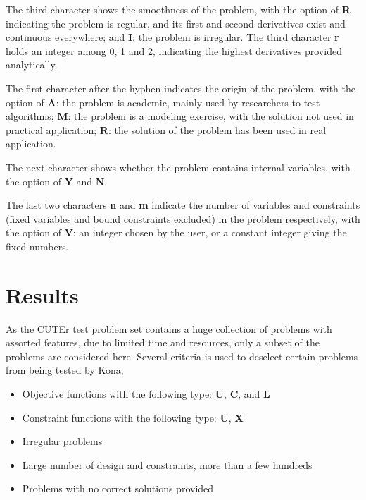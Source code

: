 The third character shows the smoothness of the problem, with the option of \textbf{R} indicating the problem is regular, and its first and second derivatives exist and continuous everywhere; and \textbf{I}: the problem is irregular. The third character \textbf{r} holds an integer among 0, 1 and 2, indicating the highest derivatives provided analytically.

The first character after the hyphen indicates the origin of the problem, with the option of \textbf{A}: the problem is academic, mainly used by researchers to test algorithms; \textbf{M}: the problem is a modeling exercise, with the solution not used in practical application; \textbf{R}: the solution of the problem has been used in real application.  

The next character shows whether the problem contains internal variables, with the option of \textbf{Y} and \textbf{N}. 

The last two characters \textbf{n} and \textbf{m} indicate the number of variables and constraints (fixed variables and bound constraints excluded) in the problem respectively, with the option of \textbf{V}: an integer chosen by the user, or a constant integer giving the fixed numbers. 

\section{Results}
As the CUTEr test problem set contains a huge collection of problems with assorted features, due to limited time and resources, only a subset of the problems are considered here. Several criteria is used to deselect certain problems from being tested by Kona, 
\begin{itemize}
\item Objective functions with the following type: \textbf{U},  \textbf{C}, and \textbf{L}
\item Constraint functions with the following type: \textbf{U},  \textbf{X}
\item Irregular problems 
\item Large number of design and constraints, more than a few hundreds
\item Problems with no correct solutions provided
\end{itemize}




